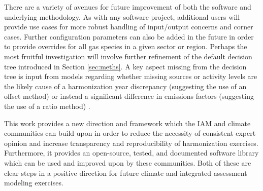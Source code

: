 There are a variety of avenues for future improvement of both the 
software and underlying methodology. As with any software project, additional
users will provide use cases for more robust handling of input/output concerns
and corner cases. Further configuration parameters can also be added in the
future in order to provide overrides for all gas species in a given sector or
region. Perhaps the most fruitful investigation will involve further refinement
of the default decision tree introduced in Section \ref{sec:meths}. A key aspect
missing from the decision tree is input from models regarding whether missing
sources or activity levels are the likely cause of a harmonization year
discrepancy (suggesting the
% 
% 
use of an offset method) or instead a significant difference in emissions
% 
% 
factors (suggesting the use of a ratio method) \cite{rogelj_discrepancies_2011}.

This work provides a new direction and framework which the IAM and climate
communities can build upon in order to reduce the necessity of consistent expert
opinion and increase transparency and reproducibility of harmonization
exercises. Furthermore, it provides an open-source, tested, and documented
software library which can be used and improved upon by these communities. Both
of these are clear steps in a positive direction for future climate and
integrated assessment modeling exercises.
